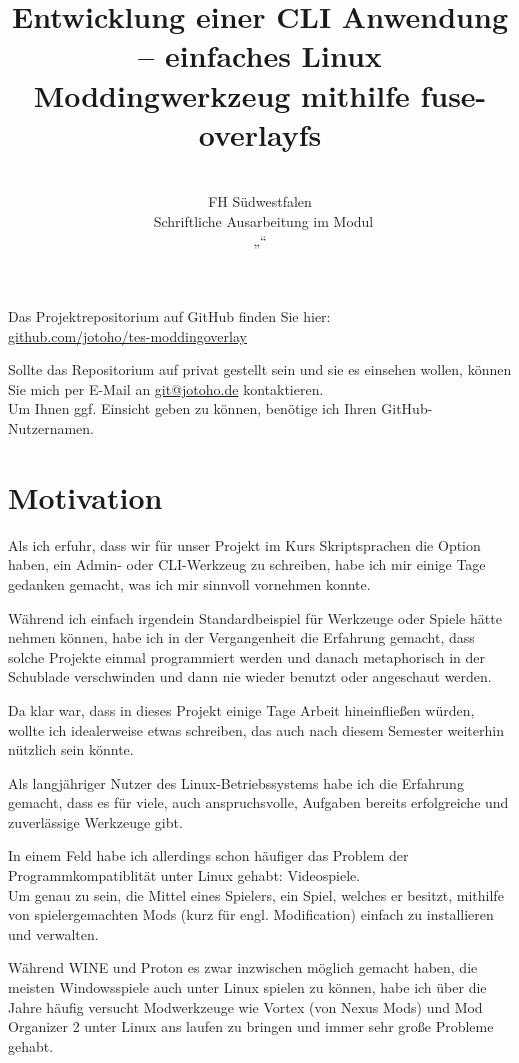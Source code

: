 \documentclass[a4paper,numbers=withenddot,11pt]{scrartcl}
\title{Entwicklung einer CLI Anwendung -- einfaches Linux Moddingwerkzeug mithilfe fuse-overlayfs}
\author{\autorname\\ FH Südwestfalen \\[5mm] Schriftliche Ausarbeitung im Modul\\ „\modulname“}
\begin{document}
\maketitle
\tableofcontents

Das Projektrepositorium auf GitHub finden Sie hier:\\
\href{https://github.com/jotoho/tes-moddingoverlay}{github.com/jotoho/tes-moddingoverlay}

Sollte das Repositorium auf privat gestellt sein und sie es einsehen wollen,
können Sie mich per E-Mail an \href{mailto:git@jotoho.de}{git@jotoho.de} kontaktieren.\\
Um Ihnen ggf. Einsicht geben zu können, benötige ich Ihren GitHub-Nutzernamen.

\section{Motivation}

Als ich erfuhr, dass wir für unser Projekt im Kurs Skriptsprachen die Option haben,
ein Admin- oder CLI-Werkzeug zu schreiben, habe ich mir einige Tage gedanken gemacht,
was ich mir sinnvoll vornehmen konnte.

Während ich einfach irgendein Standardbeispiel für Werkzeuge oder Spiele hätte nehmen
können, habe ich in der Vergangenheit die Erfahrung gemacht, dass solche Projekte
einmal programmiert werden und danach metaphorisch in der Schublade verschwinden und
dann nie wieder benutzt oder angeschaut werden.

Da klar war, dass in dieses Projekt einige Tage Arbeit hineinfließen würden,
wollte ich idealerweise etwas schreiben, das auch nach diesem Semester weiterhin
nützlich sein könnte.

Als langjähriger Nutzer des Linux-Betriebssystems habe ich die Erfahrung gemacht,
dass es für viele, auch anspruchsvolle, Aufgaben bereits erfolgreiche und
zuverlässige Werkzeuge gibt.

In einem Feld habe ich allerdings schon häufiger das Problem der Programmkompatiblität
unter Linux gehabt: Videospiele.\\
Um genau zu sein, die Mittel eines Spielers, ein Spiel, welches er besitzt,
mithilfe von spielergemachten Mods (kurz für engl. Modification) einfach zu installieren
und verwalten.

Während WINE und Proton es zwar inzwischen möglich gemacht haben, die meisten
Windowsspiele auch unter Linux spielen zu können, habe ich über die Jahre häufig
versucht Modwerkzeuge wie Vortex (von Nexus Mods) und Mod Organizer 2 unter Linux
ans laufen zu bringen und immer sehr große Probleme gehabt.
\end{document}
